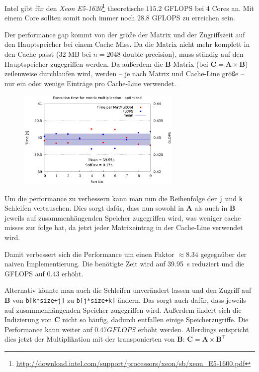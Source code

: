 \documentclass[a4paper,11pt]{scrartcl}
\begin{document}
Intel gibt für den \emph{Xeon E5-1620}\footnote{\url{http://download.intel.com/support/processors/xeon/sb/xeon_E5-1600.pdf}} theoretische $115.2$ GFLOPS bei 4 Cores an. Mit einem Core sollten somit noch immer noch $28.8$ GFLOPS zu erreichen sein.

Der performance gap kommt von der größe der Matrix und der Zugriffszeit auf den Hauptspeicher bei einem Cache Miss. Da die Matrix nicht mehr komplett in den Cache passt (32 MB bei $n=2048$ double-precision), muss ständig auf den Hauptspeicher zugegriffen werden. Da außerdem die $\mathbf{B}$ Matrix (bei $\mathbf{C}=\mathbf{A}\times \mathbf{B}$) zeilenweise durchlaufen wird, werden -- je nach Matrix und Cache-Line größe -- nur ein oder wenige Einträge pro Cache-Line verwendet. \\


\begin{figure}[!ht]
    \centering
    \includegraphics[width=0.7\textwidth,keepaspectratio]{2_3/data/opt.eps}
\end{figure}

Um die performance zu verbessern kann man nun die Reihenfolge der \verb+j+ und \verb+k+ Schleifen vertauschen. Dies sorgt dafür, dass nun sowohl in $\mathbf{A}$ als auch in $\mathbf{B}$ jeweils auf zusammenhängenden Speicher zugegriffen wird, was weniger cache misses zur folge hat, da jetzt jeder Matrixeintrag in der Cache-Line verwendet wird.

Damit verbessert sich die Performance um einen Faktor $\approx 8.34$ gegegnüber der naiven Implementierung. Die benötigte Zeit wird auf \SI{39.95}{\second} reduziert und die GFLOPS auf $0.43$ erhöht. 

Alternativ könnte man auch die Schleifen unverändert lassen und den Zugriff auf $\mathbf{B}$ von \verb|b[k*size+j]| zu \verb|b[j*size+k]| ändern. Das sorgt auch dafür, dass jeweils auf zusammenhängenden Speicher zugegriffen wird. Außerdem ändert sich die Indizierung von $\mathbf{C}$ nicht so häufig, dadurch entfallen einige Speicherzugriffe.
Die Performance kann weiter auf $0.47 GFLOPS$ erhöht werden. Allerdings entspricht dies jetzt der Multiplikation mit der transponierten von $\mathbf{B}$: $\mathbf{C}=\mathbf{A}\times \mathbf{B}^\intercal$
\end{document}
